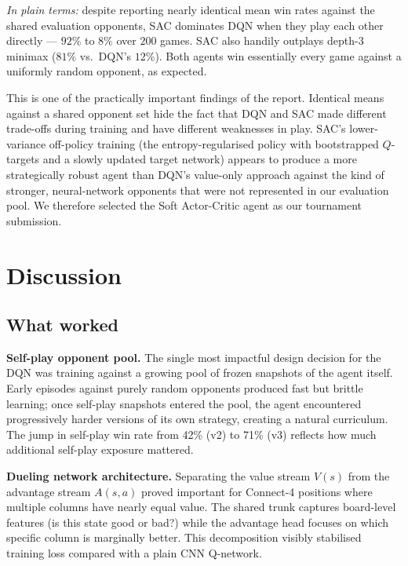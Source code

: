 \documentclass[11pt]{article}
\begin{document}
\textit{In plain terms:} despite reporting nearly identical mean win
rates against the shared evaluation opponents, SAC dominates DQN when
they play each other directly --- $92\%$ to $8\%$ over $200$ games.
SAC also handily outplays depth-$3$ minimax ($81\%$ vs.\ DQN's $12\%$).
Both agents win essentially every game against a uniformly random
opponent, as expected.

This is one of the practically important findings of the report.
Identical means against a shared opponent set hide the fact that DQN
and SAC made different trade-offs during training and have different
weaknesses in play. SAC's lower-variance off-policy training (the
entropy-regularised policy with bootstrapped $Q$-targets and a slowly
updated target network) appears to produce a more strategically robust
agent than DQN's value-only approach against the kind of stronger,
neural-network opponents that were not represented in our evaluation
pool. We therefore selected the Soft Actor-Critic agent as our
tournament submission.

\section{Discussion}
\label{sec:discussion}

\subsection{What worked}

\textbf{Self-play opponent pool.} The single most impactful design
decision for the DQN was training against a growing pool of frozen
snapshots of the agent itself. Early episodes against purely random
opponents produced fast but brittle learning; once self-play snapshots
entered the pool, the agent encountered progressively harder versions of
its own strategy, creating a natural curriculum. The jump in self-play
win rate from 42\% (v2) to 71\% (v3) reflects how much additional
self-play exposure mattered.

\textbf{Dueling network architecture.} Separating the value stream
$V(s)$ from the advantage stream $A(s,a)$ proved important for
Connect-4 positions where multiple columns have nearly equal value.
The shared trunk captures board-level features (is this state good or
bad?) while the advantage head focuses on which specific column is
marginally better. This decomposition visibly stabilised training
loss compared with a plain CNN Q-network.
\end{document}
